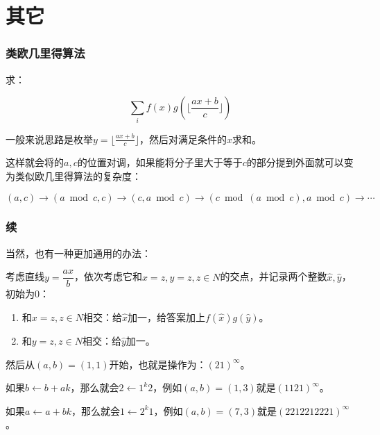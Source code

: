 \documentclass[10pt]{beamer}
\begin{document}
	\section{其它}
	\begin{frame}
		\frametitle{类欧几里得算法}
	
		求：

		$$
		\sum_i f(x)g(\lfloor\frac{ax+b}c\rfloor)
		$$

		一般来说思路是枚举$y=\lfloor\frac{ax+b}c\rfloor$，然后对满足条件的$x$求和。

		这样就会将的$a,c$的位置对调，如果能将分子里大于等于$c$的部分提到外面就可以变为类似欧几里得算法的复杂度：

		$$
		(a,c)\rightarrow(a\bmod c,c)\rightarrow(c,a\bmod c)\rightarrow(c\bmod(a\bmod c),a\bmod c)\rightarrow \cdots
		$$
	
	\end{frame}
	\begin{frame}
		\frametitle{续}
	
		当然，也有一种更加通用的办法：

		考虑直线$y=\dfrac{ax}b$，依次考虑它和$x=z,y=z,z\in N$的交点，并记录两个整数$\hat x,\hat y$，初始为$0$：

		\begin{enumerate}
			\item 和$x=z,z\in N$相交：给$\hat x$加一，给答案加上$f(\hat x)g(\hat y)$。
			\item 和$y=z,z\in N$相交：给$\hat y$加一。
		\end{enumerate}
	
		然后从$(a,b)=(1,1)$开始，也就是操作为：$(21)^{\infty}$。

		如果$b\leftarrow b+ak$，那么就会$2\leftarrow 1^k2$，例如$(a,b)=(1,3)$就是$(1121)^{\infty}$。

		如果$a\leftarrow a+bk$，那么就会$1\leftarrow 2^k1$，例如$(a,b)=(7,3)$就是$(2212212221)^{\infty}$。
	\end{frame}
\end{document}

